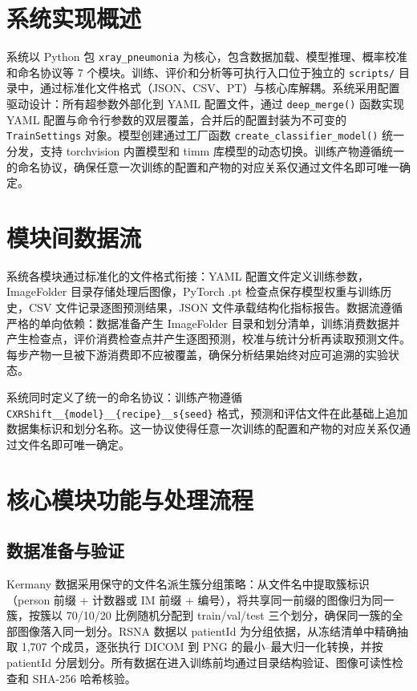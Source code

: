 \documentclass[12pt,a4paper,UTF8,openany]{ctexbook}
\begin{document}
\section{系统实现概述}

系统以 Python 包 \texttt{xray\_pneumonia} 为核心，包含数据加载、模型推理、概率校准和命名协议等 7 个模块。训练、评价和分析等可执行入口位于独立的 \texttt{scripts/} 目录中，通过标准化文件格式（JSON、CSV、PT）与核心库解耦。系统采用配置驱动设计：所有超参数外部化到 YAML 配置文件，通过 \texttt{deep\_merge()} 函数实现 YAML 配置与命令行参数的双层覆盖，合并后的配置封装为不可变的 \texttt{TrainSettings} 对象。模型创建通过工厂函数 \texttt{create\_classifier\_model()} 统一分发，支持 torchvision 内置模型和 timm 库模型的动态切换。训练产物遵循统一的命名协议，确保任意一次训练的配置和产物的对应关系仅通过文件名即可唯一确定。

\section{模块间数据流}

系统各模块通过标准化的文件格式衔接：YAML 配置文件定义训练参数，ImageFolder 目录存储处理后图像，PyTorch .pt 检查点保存模型权重与训练历史，CSV 文件记录逐图预测结果，JSON 文件承载结构化指标报告。数据流遵循严格的单向依赖：数据准备产生 ImageFolder 目录和划分清单，训练消费数据并产生检查点，评价消费检查点并产生逐图预测，校准与统计分析再读取预测文件。每步产物一旦被下游消费即不应被覆盖，确保分析结果始终对应可追溯的实验状态。

系统同时定义了统一的命名协议：训练产物遵循 \texttt{CXRShift\_\_\{model\}\_\_\{recipe\}\_\_s\{seed\}} 格式，预测和评估文件在此基础上追加数据集标识和划分名称。这一协议使得任意一次训练的配置和产物的对应关系仅通过文件名即可唯一确定。

\section{核心模块功能与处理流程}

\subsection{数据准备与验证}

Kermany 数据采用保守的文件名派生簇分组策略：从文件名中提取簇标识（person 前缀 + 计数器或 IM 前缀 + 编号），将共享同一前缀的图像归为同一簇，按簇以 70/10/20 比例随机分配到 train/val/test 三个划分，确保同一簇的全部图像落入同一划分。RSNA 数据以 patientId 为分组依据，从冻结清单中精确抽取 1,707 个成员，逐张执行 DICOM 到 PNG 的最小--最大归一化转换，并按 patientId 分层划分。所有数据在进入训练前均通过目录结构验证、图像可读性检查和 SHA-256 哈希核验。
\end{document}
